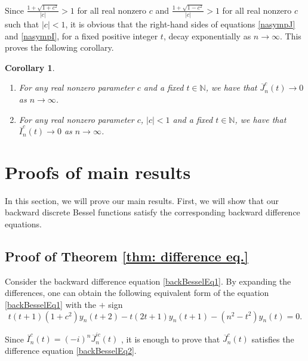 \documentclass[12pt]{amsart}
\numberwithin{equation}{section}
\newtheorem{corollary}[theorem]{Corollary}
\begin{document}
Since $\frac{1+\sqrt{1+c^{2}}}{\left\vert c\right\vert
}>1$ for all real nonzero $c$ and $\frac{1+\sqrt{1-c^{2}}}{\left\vert c\right\vert} >1$ for all real nonzero $c$ such that $\left\vert c\right\vert <1$, it is obvious that the right-hand sides of equations \eqref{nasympJ} and \eqref{nasympI}, for a fixed positive integer $t$,  decay exponentially as $n\to \infty$. This proves the following corollary.
\begin{corollary}
\hfill
\begin{enumerate}[label=\normalfont(\roman*)]
 \item For  any real nonzero parameter $c$ and a fixed $t\in \mathbb{N}$, we
have that $\overline{J}_{n}^{c}\left( t\right) \rightarrow 0$ as $
n\rightarrow \infty $.
  \item For any real nonzero parameter $c$, $\left\vert c\right\vert <1$ and a
fixed $t\in \mathbb{N}$, we have that $\overline{I}_{n}^{c}\left( t\right) \rightarrow 0$ as $%
n\rightarrow \infty $.
\end{enumerate}
  \end{corollary}

\vspace{1.5cc}
\section{Proofs of main results}\label{main_section}

In this section, we will prove our main results. First, we will show that our
backward discrete Bessel functions satisfy the corresponding backward difference
equations.

\setcounter{subsection}{0}
\subsection{Proof of Theorem \protect\ref{thm: difference eq.}}

Consider the backward difference equation \eqref{backBesselEq1}. By
expanding the differences, one can obtain the following equivalent form of the equation
\eqref{backBesselEq1} with the $+$ sign
\begin{equation}
t\left( t+1\right) (1+c^{2})y_{n}\left( t+2\right) -t\left( 2t+1\right)
y_{n}\left( t+1\right) -\left( n^{2}-t^{2}\right) y_{n}\left( t\right) =0.
\label{backBesselEq2}
\end{equation}

Since $\overline{I}_{n}^{c}(t) = \left(-i\right)^n \overline{J}_{n}^{ic} (t)$%
, it is enough to prove that $\overline{J}_{n}^{c}\left( t\right) $
satisfies the difference equation \eqref{backBesselEq2}.
\end{document}
